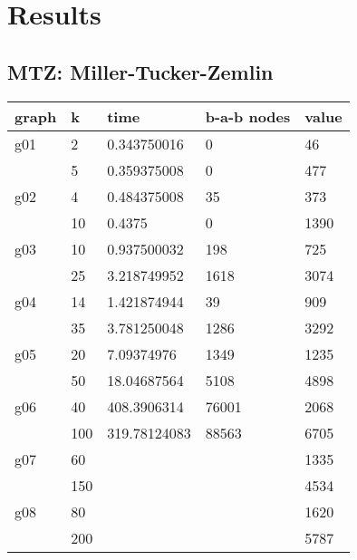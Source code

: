 
\section{Results}

\subsection{MTZ: Miller-Tucker-Zemlin}
\begin{tabular}{| l l l l l |}
graph	&	k	&	time	&	b-a-b nodes &	value	\\ \hline
g01	&	2	&	0.343750016	&	0			&	46	\\
	&	5	&	0.359375008	&	0			&	477	\\ \hline
g02	&	4	&	0.484375008	&	35			&	373	\\
	&	10	&	0.4375		&	0			&	1390	\\ \hline
g03	&	10	&	0.937500032	&	198			&	725	\\
	&	25	&	3.218749952	&	1618		&	3074	\\ \hline
g04	&	14	&	1.421874944	&	39			&	909	\\
	&	35	&	3.781250048	&	1286		&	3292	\\ \hline
g05	&	20	&	7.09374976	&	1349		&	1235	\\
	&	50	&	18.04687564	&	5108		&	4898	\\ \hline
g06	&	40	&	408.3906314	&	76001		&	2068	\\
	&	100	&	319.78124083&	88563		&	6705	\\ \hline
g07	&	60	&				&		&	1335	\\
	&	150	&				&		&	4534	\\ \hline
g08	&	80	&				&		&	1620	\\
	&	200	&				&		&	5787	\\ \hline
\end{tabular}

